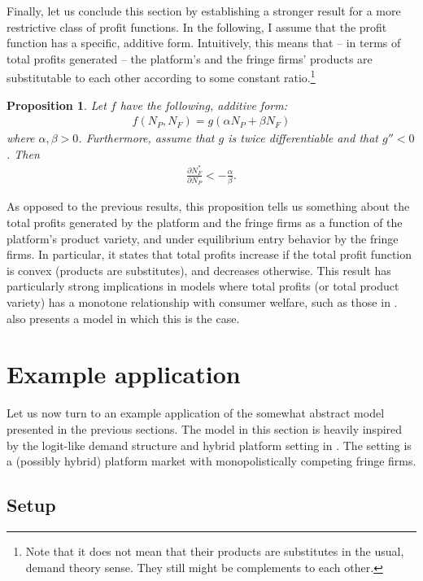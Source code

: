 \documentclass[a4paper]{article}
\newtheorem{proposition}{Proposition}
\begin{document}
Finally, let us conclude this section by establishing a stronger result for a more restrictive class of profit functions.
In the following, I assume that the profit function has a specific, additive form.
Intuitively, this means that -- in terms of total profits generated -- the platform's and the fringe firms' products are substitutable to each other according to some constant ratio.\footnote{
    Note that it does not mean that their products are substitutes in the usual, demand theory sense.
    They still might be complements to each other.
}
\begin{proposition}
    \label{prop:aggregate_size_additive}
    Let $f$ have the following, additive form:
    \begin{align*}
        f(N_P, N_F) = g(\alpha N_P + \beta N_F)
    \end{align*}
    where $\alpha, \beta > 0$.
    Furthermore, assume that $g$ is twice differentiable and that $g'' < 0$.
    Then
    \begin{align*}
        \frac{\partial N_F^*}{\partial N_P} < -\frac{\alpha}{\beta}.
    \end{align*}
\end{proposition}
As opposed to the previous results, this proposition tells us something about the total profits generated by the platform and the fringe firms as a function of the platform's product variety, and under equilibrium entry behavior by the fringe firms.
In particular, it states that total profits increase if the total profit function is convex (products are substitutes), and decreases otherwise.
This result has particularly strong implications in models where total profits (or total product variety) has a monotone relationship with consumer welfare, such as those in \textcite{anderson2020aggregative}.
 also presents a model in which this is the case.


\section{Example application}
\label{sec:example}

Let us now turn to an example application of the somewhat abstract model presented in the previous sections.
The model in this section is heavily inspired by the logit-like demand structure and hybrid platform setting in  \textcite{anderson2021hybrid}.
The setting is a (possibly hybrid) platform market with monopolistically competing fringe firms.

\subsection{Setup}
\end{document}
